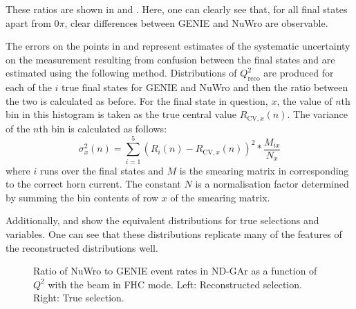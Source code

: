 These ratios are shown in  and . 
Here, one can clearly see that, for all final states apart from $0\pi$, clear differences between GENIE and NuWro are observable.

The errors on the points in  and  represent estimates of the systematic uncertainty on the measurement resulting from confusion between the final states and are estimated using the following method.
Distributions of $Q^{2}_{\textrm{reco}}$ are produced for each of the $i$ true final states for GENIE and NuWro and then the ratio between the two is calculated as before.
For the final state in question, $x$, the value of $n$th bin in this histogram is taken as the true central value $R_{\textrm{CV}, x}(n)$.
The variance of the $n$th bin is calculated as follows:
\begin{equation}
	\sigma_{x}^{2}(n) = \sum_{i=1}^{5} \left( R_{i}(n) - R_{\textrm{CV}, x}(n) \right)^{2} * \frac{M_{i x}}{N_{x}}
\end{equation}
where $i$ runs over the final states and $M$ is the smearing matrix in  corresponding to the correct horn current.
The constant $N$ is a normalisation factor determined by summing the bin contents of row $x$ of the smearing matrix. 

Additionally,  and  show the equivalent distributions for true selections and variables. 
One can see that these distributions replicate many of the features of the reconstructed distributions well.

\begin{figure}[h]
	\begin{minipage}[t]{.5\linewidth}
		\begin{adjustbox}{max totalsize=\linewidth, center}
			
		\end{adjustbox}
	\end{minipage}
 	\hfill
 	\begin{minipage}[t]{.5\linewidth}
 		\begin{adjustbox}{max totalsize=\linewidth, center}
 			
 		\end{adjustbox}
 	\end{minipage}
 	\caption[Comparison of NuWro and GENIE in $Q^{2}$ for forward horn current]{Ratio of NuWro to GENIE event rates in ND-GAr as a function of $Q^{2}$ with the beam in FHC mode. Left: Reconstructed selection. Right: True selection.}
 	\label{fig:Q2CompFhc}
\end{figure}

